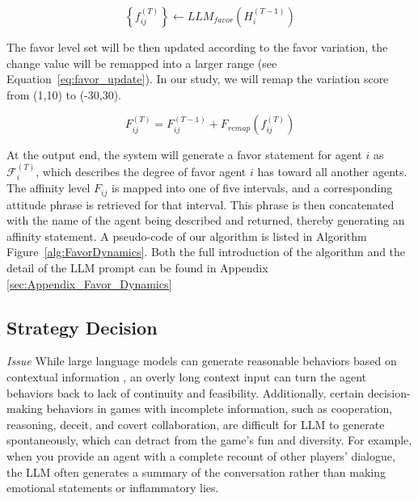 \begin{equation}
  \left\{ f_{ij}^{(T)} \right\} \leftarrow LLM_{favor}( H_i^{(T-1)} ) 
  \label{eq:favor_LLM}
\end{equation}

The favor level set will be then updated according to the favor variation, the change value will be remapped into a larger range (see Equation~\ref{eq:favor_update}). In our study, we will remap the variation score from (1,10) to (-30,30).

\begin{equation}
  F_{ij}^{(T)} = F_{ij}^{(T-1)} + F_{remap}(f_{ij}^{(T)})
  \label{eq:favor_update}
\end{equation}

At the output end, the system will generate a favor statement for agent $ i $ as $ \mathcal{F}_i^{(T)} $, which describes the degree of favor agent $ i $ has toward all another agents. The affinity level $ F_{ij} $ is mapped into one of five intervals, and a corresponding attitude phrase is retrieved for that interval. This phrase is then concatenated with the name of the agent being described and returned, thereby generating an affinity statement. A pseudo-code of our algorithm is listed in Algorithm Figure~\ref{alg:FavorDynamics}. Both the full introduction of the algorithm and the detail of the LLM prompt can be found in Appendix \ref{sec:Appendix_Favor_Dynamics}


\subsection{Strategy Decision} \label{sec:StrategyDecision}

\textit{Issue} While large language models can generate reasonable behaviors based on contextual information \citep{dillion2023can,horton2023large,park2022social}, an overly long context input can turn the agent behaviors back to lack of continuity and feasibility. Additionally, certain decision-making behaviors in games with incomplete information, such as cooperation, reasoning, deceit, and covert collaboration, are difficult for LLM to generate spontaneously, which can detract from the game's fun and diversity. For example, when you provide an agent with a complete recount of other players' dialogue, the LLM often generates a summary of the conversation rather than making emotional statements or inflammatory lies.

